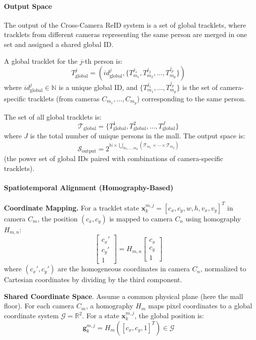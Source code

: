 \documentclass[12pt, a4paper]{article}
\begin{document}
\paragraph{Output Space}
The output of the Cross-Camera ReID system is a set of global tracklets, where tracklets from different cameras representing the same person are merged in one set and assigned a shared global ID.

A global tracklet for the $j$-th person is:
  \[
  T^j_{\text{global}} = (id_{\text{global}}^j, \{ T_{m_1}^{j_1}, T_{m_2}^{j_2}, \ldots, T_{m_p}^{j_p} \})
  \]
  where $id_{\text{global}}^j \in \mathbb{N}$ is a unique global ID, and $\{ T_{m_1}^{j_1}, \ldots, T_{m_p}^{j_p} \}$ is the set of camera-specific tracklets (from cameras $C_{m_1}, \ldots, C_{m_p}$) corresponding to the same person.

The set of all global tracklets is:
  \[
  \mathcal{T}_{\text{global}} = \{ T^1_{\text{global}}, T^2_{\text{global}}, \ldots, T^J_{\text{global}} \}
  \]
  where $J$ is the total number of unique persons in the mall. The output space is:
  \[
  \mathcal{S}_{\text{output}} = 2^{\mathbb{N} \times \bigcup_{m_1, \ldots, m_p} (\mathcal{T}_{m_1} \times \cdots \times \mathcal{T}_{m_p})}
  \]
  (the power set of global IDs paired with combinations of camera-specific tracklets).


\paragraph{Spatiotemporal Alignment (Homography-Based)}

\textbf{Coordinate Mapping.} For a tracklet state $\mathbf{x}_k^{m,j} = [c_x, c_y, w, h, v_x, v_y]^T$ in camera $C_m$, the position $(c_x, c_y)$ is mapped to camera $C_n$ using homography $H_{m,n}$:
  \[
  \begin{bmatrix} c_x' \\ c_y' \\ 1 \end{bmatrix} = H_{m,n} \begin{bmatrix} c_x \\ c_y \\ 1 \end{bmatrix}
  \]
  where $(c_x', c_y')$ are the homogeneous coordinates in camera $C_n$, normalized to Cartesian coordinates by dividing by the third component.

\textbf{Shared Coordinate Space}. Assume a common physical plane (here the mall floor). For each camera $C_m$, a homography $H_m$ maps pixel coordinates to a global coordinate system $\mathcal{G} = \mathbb{R}^2$. For a state $\mathbf{x}_k^{m,j}$, the global position is:
  \[
  \mathbf{g}_k^{m,j} = H_m ([c_x, c_y, 1]^T) \in \mathcal{G}
  \]
\end{document}
